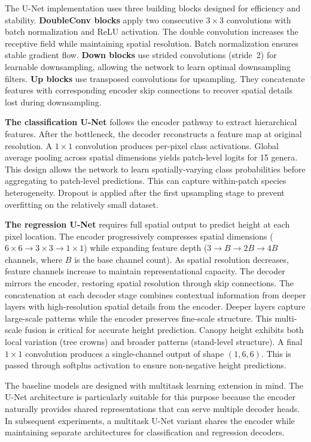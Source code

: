 The U-Net implementation uses three building blocks designed for efficiency and stability. \textbf{DoubleConv blocks} apply two consecutive $3 \times 3$ convolutions with batch normalization and ReLU activation. The double convolution increases the receptive field while maintaining spatial resolution. Batch normalization ensures stable gradient flow. \textbf{Down blocks} use strided convolutions (stride~2) for learnable downsampling, allowing the network to learn optimal downsampling filters. \textbf{Up blocks} use transposed convolutions for upsampling. They concatenate features with corresponding encoder skip connections to recover spatial details lost during downsampling.

\textbf{The classification U-Net} follows the encoder pathway to extract hierarchical features. After the bottleneck, the decoder reconstructs a feature map at original resolution. A $1 \times 1$ convolution produces per-pixel class activations. Global average pooling across spatial dimensions yields patch-level logits for 15 genera. This design allows the network to learn spatially-varying class probabilities before aggregating to patch-level predictions. This can capture within-patch species heterogeneity. Dropout is applied after the first upsampling stage to prevent overfitting on the relatively small dataset.

\textbf{The regression U-Net} requires full spatial output to predict height at each pixel location. The encoder progressively compresses spatial dimensions ($6\times 6 \rightarrow 3\times 3 \rightarrow 1\times 1$) while expanding feature depth ($3 \rightarrow B \rightarrow 2B \rightarrow 4B$ channels, where $B$ is the base channel count). As spatial resolution decreases, feature channels increase to maintain representational capacity. The decoder mirrors the encoder, restoring spatial resolution through skip connections. The concatenation at each decoder stage combines contextual information from deeper layers with high-resolution spatial details from the encoder. Deeper layers capture large-scale patterns while the encoder preserves fine-scale structure. This multi-scale fusion is critical for accurate height prediction. Canopy height exhibits both local variation (tree crowns) and broader patterns (stand-level structure). A final $1 \times 1$ convolution produces a single-channel output of shape $(1, 6, 6)$. This is passed through softplus activation to ensure non-negative height predictions.

The baseline models are designed with multitask learning extension in mind. The U-Net architecture is particularly suitable for this purpose because the encoder naturally provides shared representations that can serve multiple decoder heads. In subsequent experiments, a multitask U-Net variant shares the encoder while maintaining separate architectures for classification and regression decoders.

